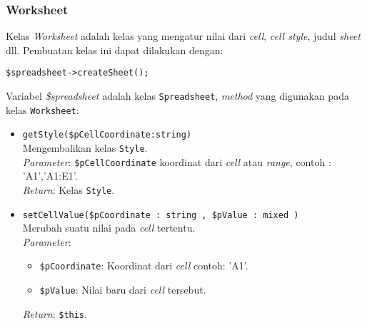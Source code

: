 \subsubsection{Worksheet}
Kelas \textit{Worksheet} adalah kelas yang mengatur nilai dari \textit{cell}, \textit{cell style}, judul \textit{sheet} dll. Pembuatan kelas ini dapat dilakukan dengan:
\begin{lstlisting}
$spreadsheet->createSheet();
\end{lstlisting}
Variabel \textit{\$spreadsheet} adalah kelas \texttt{Spreadsheet}, \textit{method} yang digunakan pada kelas \texttt{Worksheet}:

\begin{itemize}
	\item \texttt{getStyle(\$pCellCoordinate:string)} \\ 
	Mengembalikan kelas \texttt{Style}.\\
	\textit{Parameter}: \texttt{\$pCellCoordinate} koordinat dari \textit{cell} atau \textit{range}, contoh : 'A1','A1:E1'.\\
	\textit{Return}: Kelas \texttt{Style}.
	
	\item \texttt{setCellValue(\$pCoordinate : string , \$pValue : mixed )}\\ 
	Merubah suatu nilai pada \textit{cell} tertentu. \\ 
	\textit{Parameter}:
	\begin{itemize}
		\item \texttt{\$pCoordinate}: Koordinat dari \textit{cell} contoh: 'A1'.
		\item \texttt{\$pValue}: Nilai baru dari \textit{cell} tersebut.
	\end{itemize}
	\textit{Return}: \texttt{\$this}.
	

\end{itemize}
